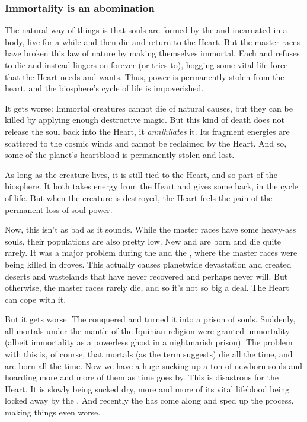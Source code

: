 \subsubsection{Immortality is an abomination}
The natural way of things is that souls are formed by the  and incarnated in a body, live for a while and then die and return to the Heart. 
But the master races have broken this law of nature by making themselves immortal. 
Each \dragon{} and \resphan{} refuses to die and instead lingers on forever (or tries to), hogging some vital life force that the Heart needs and wants. 
Thus, power is permanently stolen from the heart, and the biosphere's cycle of life is impoverished. 

It gets worse: 
Immortal creatures cannot die of natural causes, but they can be killed by applying enough destructive magic. 
But this kind of death does not release the soul back into the Heart, it \emph{annihilates} it. 
Its fragment energies are scattered to the cosmic winds and cannot be reclaimed by the Heart. 
And so, some of the planet's heartblood is permanently stolen and lost. 

As long as the creature lives, it is still tied to the Heart, and so part of the biosphere. 
It both takes energy from the Heart and gives some back, in the cycle of life. 
But when the creature is destroyed, the Heart feels the pain of the permanent loss of soul power. 

Now, this isn't as bad as it sounds. 
While the master races have some heavy-ass souls, their populations are also pretty low. 
New \dragons{} and \resphain{} are born and die quite rarely. 
It was a major problem during the \secondbanewar{} and the \resphanwars, where the master races were being killed in droves. 
This actually causes planetwide devastation and created deserts and wastelands that have never recovered and perhaps never will. 
But otherwise, the master races rarely die, and so it's not so big a deal. 
The Heart can cope with it. 

But it gets worse. 
The \banelords{} conquered \iquin{} and turned it into a prison of souls. 
Suddenly, all mortals under the mantle of the Iquinian religion were granted immortality (albeit immortality as a powerless ghost in a nightmarish prison). 
The problem with this is, of course, that mortals (as the term suggests) die all the time, and are born all the time. 
Now we have a huge  sucking up a ton of newborn souls and hoarding more and more of them as time goes by. 
This is disastrous for the Heart. 
It is slowly being sucked dry, more and more of its vital lifeblood being locked away by the \sephiroth. 
And recently the  has come along and sped up the process, making things even worse. 

